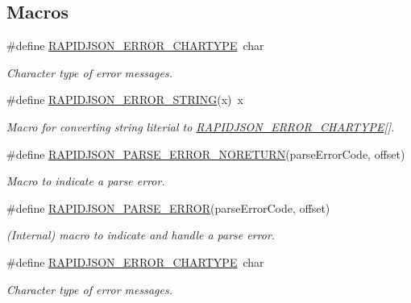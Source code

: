 \subsection*{Macros}
\begin{DoxyCompactItemize}
\item 
\#define \hyperlink{group___r_a_p_i_d_j_s_o_n___e_r_r_o_r_s_ga7e4636fd48d0148f102b8a13f0539d8c}{R\+A\+P\+I\+D\+J\+S\+O\+N\+\_\+\+E\+R\+R\+O\+R\+\_\+\+C\+H\+A\+R\+T\+Y\+PE}~char
\begin{DoxyCompactList}\small\item\em Character type of error messages. \end{DoxyCompactList}\item 
\#define \hyperlink{group___r_a_p_i_d_j_s_o_n___e_r_r_o_r_s_gabe2e1bd1349e5a7d6c1af78c05a98f0d}{R\+A\+P\+I\+D\+J\+S\+O\+N\+\_\+\+E\+R\+R\+O\+R\+\_\+\+S\+T\+R\+I\+NG}(x)~x
\begin{DoxyCompactList}\small\item\em Macro for converting string literial to \hyperlink{group___r_a_p_i_d_j_s_o_n___e_r_r_o_r_s_ga7e4636fd48d0148f102b8a13f0539d8c}{R\+A\+P\+I\+D\+J\+S\+O\+N\+\_\+\+E\+R\+R\+O\+R\+\_\+\+C\+H\+A\+R\+T\+Y\+PE}\mbox{[}\mbox{]}. \end{DoxyCompactList}\item 
\#define \hyperlink{group___r_a_p_i_d_j_s_o_n___e_r_r_o_r_s_ga7f8c4265b2edda78568ae3338aaf1461}{R\+A\+P\+I\+D\+J\+S\+O\+N\+\_\+\+P\+A\+R\+S\+E\+\_\+\+E\+R\+R\+O\+R\+\_\+\+N\+O\+R\+E\+T\+U\+RN}(parse\+Error\+Code,  offset)
\begin{DoxyCompactList}\small\item\em Macro to indicate a parse error. \end{DoxyCompactList}\item 
\#define \hyperlink{group___r_a_p_i_d_j_s_o_n___e_r_r_o_r_s_gae3689840fa6e89a241313f33b602f865}{R\+A\+P\+I\+D\+J\+S\+O\+N\+\_\+\+P\+A\+R\+S\+E\+\_\+\+E\+R\+R\+OR}(parse\+Error\+Code,  offset)
\begin{DoxyCompactList}\small\item\em (Internal) macro to indicate and handle a parse error. \end{DoxyCompactList}\item 
\#define \hyperlink{group___r_a_p_i_d_j_s_o_n___e_r_r_o_r_s_ga7e4636fd48d0148f102b8a13f0539d8c}{R\+A\+P\+I\+D\+J\+S\+O\+N\+\_\+\+E\+R\+R\+O\+R\+\_\+\+C\+H\+A\+R\+T\+Y\+PE}~char
\begin{DoxyCompactList}\small\item\em Character type of error messages. \end{DoxyCompactList}\item 

\end{DoxyCompactItemize}
